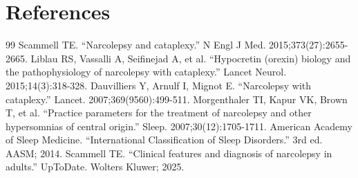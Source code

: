 \section*{References}
\begin{thebibliography}{99}
 Scammell TE. ``Narcolepsy and cataplexy.'' N Engl J Med. 2015;373(27):2655-2665.
 Liblau RS, Vassalli A, Seifinejad A, et al. ``Hypocretin (orexin) biology and the pathophysiology of narcolepsy with cataplexy.'' Lancet Neurol. 2015;14(3):318-328.
 Dauvilliers Y, Arnulf I, Mignot E. ``Narcolepsy with cataplexy.'' Lancet. 2007;369(9560):499-511.
 Morgenthaler TI, Kapur VK, Brown T, et al. ``Practice parameters for the treatment of narcolepsy and other hypersomnias of central origin.'' Sleep. 2007;30(12):1705-1711.
 American Academy of Sleep Medicine. ``International Classification of Sleep Disorders.'' 3rd ed. AASM; 2014.
 Scammell TE. ``Clinical features and diagnosis of narcolepsy in adults.'' UpToDate. Wolters Kluwer; 2025.
\end{thebibliography}
